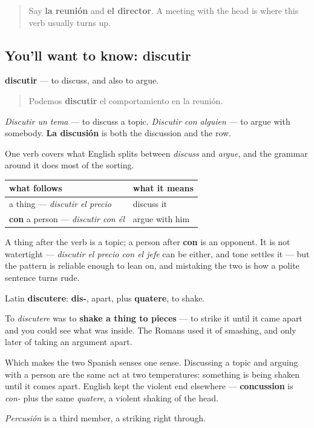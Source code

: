 \label{lesson:ES-C466-discutir}



\begin{quote}
Say \textbf{la reunión} and \textbf{el director}. A meeting with the head is where this verb usually turns up.
\end{quote}

\subsection*{You'll want to know: discutir}
\textbf{discutir} — to discuss, and also to argue.

\begin{quote}
Podemos \textbf{discutir} el comportamiento en la reunión.
\end{quote}

\emph{Discutir un tema} — to discuss a topic. \emph{Discutir con alguien} — to argue with somebody. \textbf{La discusión} is both the discussion and the row.

\begin{grammarlens}[title={Grammar Lens: the preposition decides}]
One verb covers what English splits between \emph{discuss} and \emph{argue}, and the grammar around it does most of the sorting.

\noindent
\begin{tabularx}{\linewidth}{@{}>{\raggedright\arraybackslash}X>{\raggedright\arraybackslash}X@{}}
\toprule
\textbf{what follows} & \textbf{what it means} \\
\midrule
a thing — \emph{discutir el precio} & discuss it \\
\textbf{con} a person — \emph{discutir con él} & argue with him \\
\bottomrule
\end{tabularx}

A thing after the verb is a topic; a person after \textbf{con} is an opponent. It is not watertight — \emph{discutir el precio con el jefe} can be either, and tone settles it — but the pattern is reliable enough to lean on, and mistaking the two is how a polite sentence turns rude.
\end{grammarlens}

\begin{cousinweb}
Latin \textbf{discutere}: \textbf{dis-}, apart, plus \textbf{quatere}, to shake.

To \emph{discutere} was to \textbf{shake a thing to pieces} — to strike it until it came apart and you could see what was inside. The Romans used it of smashing, and only later of taking an argument apart.

Which makes the two Spanish senses one sense. Discussing a topic and arguing with a person are the same act at two temperatures: something is being shaken until it comes apart. English kept the violent end elsewhere — \textbf{concussion} is \emph{con-} plus the same \emph{quatere}, a violent shaking of the head.

\emph{Percusión} is a third member, a striking right through.
\end{cousinweb}

